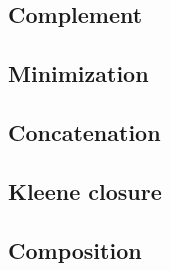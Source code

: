 \documentclass[12pt]{article}
\begin{document}
\subsection{ Complement}
\subsection{ Minimization}
\subsection{ Concatenation}
\subsection{ Kleene closure}
\subsection{ Composition}
\end{document}
